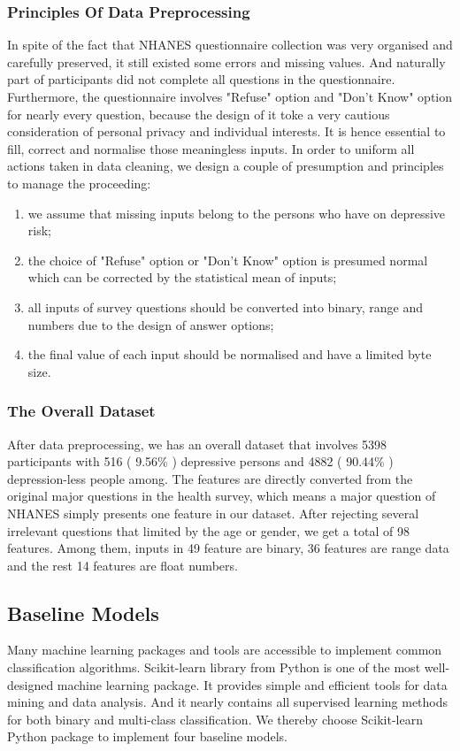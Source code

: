 \documentclass[12pt]{article}
\begin{document}
\subsubsection{Principles Of Data Preprocessing}
In spite of the fact that NHANES questionnaire collection was very organised and carefully preserved, it still existed some errors and missing values. And naturally part of participants did not complete all questions in the questionnaire. Furthermore,  the questionnaire involves "Refuse" option and "Don't Know" option for nearly every question, because the design of it toke a very cautious consideration of personal privacy and individual interests. It is hence essential to fill, correct and normalise those meaningless inputs. In order to uniform all actions taken in data cleaning, we design a couple of presumption and principles to manage the proceeding:
\begin{enumerate}[label=\alph*)]
	\item	  we assume that missing inputs belong to the persons who have on depressive risk;
	\item   the choice of "Refuse" option or "Don't Know" option is presumed normal which can be corrected by the statistical mean of inputs;
	\item	  all inputs of survey questions should be converted into binary, range and numbers due to the design of answer options;
	\item	  the final value of each input should be normalised and have a limited byte size.\\
\end{enumerate}
\smallskip

\subsubsection{The Overall Dataset}
After data preprocessing, we has an overall dataset that involves 5398 participants with 516 ( 9.56\% ) depressive persons and 4882 ( 90.44\% ) depression-less people among. The features are directly converted from the original major questions in the health survey, which means a major question of NHANES simply presents one feature in our dataset. After rejecting several irrelevant questions that limited by the age or gender, we get a total of 98 features. Among them, inputs in 49 feature are binary, 36 features are range data and the rest 14 features are float numbers. 
\\
\medskip

\subsection{Baseline Models}
Many machine learning packages and tools are accessible to implement common classification algorithms. Scikit-learn library from Python is one of the most well-designed machine learning package. It provides simple and efficient tools for data mining and data analysis. And it nearly contains all supervised learning methods for both binary and multi-class classification. We thereby choose Scikit-learn Python package to implement four baseline models.
\end{document}
